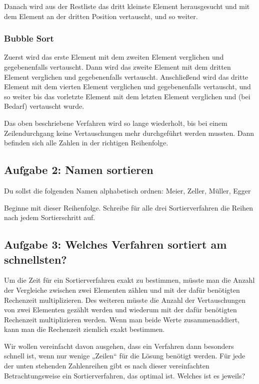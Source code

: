 Danach wird aus der Restliste das dritt kleinste Element herausgesucht und mit
dem Element an der dritten Position vertauscht, und so weiter.

\subsubsection{Bubble Sort}

Zuerst wird das erste Element mit dem zweiten Element verglichen und
gegebenenfalls vertauscht. Dann wird das zweite Element mit dem dritten Element
verglichen und gegebenenfalls vertauscht. Anschließend wird das dritte Element
mit dem vierten Element verglichen und gegebenenfalls vertauscht, und so weiter
bis das vorletzte Element mit dem letzten Element verglichen und (bei Bedarf)
vertauscht wurde.

Das oben beschriebene Verfahren wird so lange wiederholt, bis bei einem
Zeilendurchgang keine Vertauschungen mehr durchgeführt werden mussten. Dann
befinden sich alle Zahlen in der richtigen Reihenfolge.


\subsection{Aufgabe 2: Namen sortieren}

Du sollst die folgenden Namen alphabetisch ordnen: Meier, Zeller, Müller, Egger

Beginne mit dieser Reihenfolge. Schreibe für alle drei Sortierverfahren die
Reihen nach jedem Sortierschritt auf.


\subsection{Aufgabe 3: Welches Verfahren sortiert am schnellsten?}

Um die Zeit für ein Sortierverfahren exakt zu bestimmen, müsste man die Anzahl
der Vergleiche zwischen zwei Elementen zählen und mit der dafür benötigten
Rechenzeit multiplizieren. Des weiteren müsste die Anzahl der Vertauschungen
von zwei Elementen gezählt werden und wiederum mit der dafür benötigten
Rechenzeit multiplizieren werden. Wenn man beide Werte zusammenaddiert, kann
man die Rechenzeit ziemlich exakt bestimmen.

Wir wollen vereinfacht davon ausgehen, dass ein Verfahren dann besonders
schnell ist, wenn nur wenige „Zeilen“ für die Lösung benötigt werden. Für jede
der unten stehenden Zahlenreihen gibt es nach dieser vereinfachten
Betrachtungsweise ein Sortierverfahren, das optimal ist. Welches ist es jeweils?

